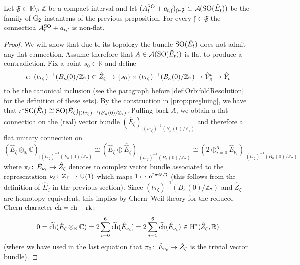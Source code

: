 \documentclass[11pt,a4paper]{scrartcl}
\newcommand{\col}{\colon \thinspace}
\newcommand{\e}{\textup{e}}
\newcommand{\G}{\textup{G}}
\newcommand{\SO}{\textup{SO}}
\newcommand{\U}{\textup{U}}
\renewcommand{\H}{\textup{H}}
\numberwithin{equation}{section}
\theoremstyle{plain}
\theoremstyle{definition}
\theoremstyle{remark}
\begin{document}
\begin{proposition}\label{prop:example18-non-flat-instantons}
Let $\mathfrak{F}\subset \mathbb{R}\setminus \pi \mathbb{Z}$ be a compact interval and let $(A_{t}^\SO+a_{t,\mathfrak{f}})_{\mathfrak{f}\in \mathfrak{F}} \subset \mathcal{A}(\SO(\hat{E}_{t}))$ be the family of $\G_2$-instantons of the previous proposition. For every $\mathfrak{f}\in \mathfrak{F}$ the connection $A_{t}^\SO+ a_{t,\mathfrak{f}}$ is non-flat.  
\end{proposition}
\begin{proof}
We will show that due to its topology the bundle $\SO(\hat{E}_t)$ does not admit any flat connection. Assume therefore that $A \in \mathcal{A}(\SO(\hat{E}_t))$ is flat to produce a contradiction. Fix a point $s_0 \in \mathbb{R}$ and define \[ \iota \col (t\tau_\zeta)^{-1}(B_\kappa(0)/\mathbb{Z}_7)\subset \hat{Z}_\zeta \to \{s_0\} \times (t\tau_\zeta)^{-1}(B_\kappa(0)/\mathbb{Z}_7) \to \hat{\mathcal{V}}_{\kappa}^t \to \hat{Y}_t \] to be the canonical inclusion (see the paragraph before \autoref{def:OrbifoldResolution} for the definition of these sets). By the construction in \autoref{prop:pregluing}, we have that $\iota^*\SO(\hat{E}_{t}) \cong \SO(\hat{E}_\zeta)_{\vert (t\tau_\zeta)^{-1}(B_\kappa(0)/\mathbb{Z}_7)}$. Pulling back $A$, we obtain a flat connection on the (real) vector bundle $(\hat{E}_{\zeta})_{{\vert (t\tau_\zeta)^{-1}(B_\kappa(0)/\mathbb{Z}_7)}}$ and therefore a flat unitary connection on \[(\hat{E}_\zeta\otimes_\mathbb{R} \mathbb{C})_{{\vert (t\tau_\zeta)^{-1}(B_\kappa(0)/\mathbb{Z}_7)}} \cong (\hat{E}_\zeta\oplus \overline{\hat{E}}_\zeta)_{{\vert (t\tau_\zeta)^{-1}(B_\kappa(0)/\mathbb{Z}_7)}}\cong (2 \oplus_{i=0}^{6} \hat{E}_{\nu_i})_{{\vert (t\tau_\zeta)^{-1}(B_\kappa(0)/\mathbb{Z}_7)}} \] where $\pi_\ell \col \hat{E}_{\nu_\ell} \to \hat{Z}_\zeta$ denotes to complex vector bundle associated to the representation $\nu_\ell \col \mathbb{Z}_7 \to \U(1)$ which maps $1 \mapsto \e^{2\pi i \ell/7}$ (this follows from the definition of $\hat{E}_\zeta$ in the previous section). Since $(t\tau_\zeta)^{-1}(B_\kappa(0)/\mathbb{Z}_7)$ and $\hat{Z}_\zeta$ are homotopy-equivalent, this implies by Chern--Weil theory for the reduced Chern-character $\widetilde{\textup{ch}} = \textup{ch} - \textup{rk}$: 
\begin{equation}\label{eq:example18_reduced_Chern-character}
 0 = \widetilde{\textup{ch}}(\hat{E}_\zeta \otimes_\mathbb{R} \mathbb{C}) = 2 \sum_{i=0}^6 \widetilde{\textup{ch}}(\hat{E}_{\nu_i}) = 2 \sum_{i=1}^6 \widetilde{\textup{ch}}(\hat{E}_{\nu_i}) \in \H^*(\hat{Z}_\zeta,\mathbb{R})
\end{equation}
(where we have used in the last equation that $\pi_0 \col \hat{E}_{\nu_0} \to \hat{Z}_\zeta$ is the trivial vector bundle).


\end{proof}
\end{document}
